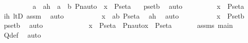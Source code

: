 \begin{isabellebody}
\ \ \ \ \ \ \isamarkupfalse%
\ \isamarkupfalse%
\ a\ \ ah\ {\isacharcolon}{\kern0pt}\ {\isachardoublequoteopen}a\ {\isacharless}{\kern0pt}\ b{\isachardoublequoteclose}\ {\isachardoublequoteopen}Pn{\isacharunderscore}{\kern0pt}auto{\isacharparenleft}{\kern0pt}{\isasympi}{\isacharparenright}{\kern0pt}\ {\isacharbackquote}{\kern0pt}\ x\ {\isasymin}\ P{\isacharunderscore}{\kern0pt}set{\isacharparenleft}{\kern0pt}a{\isacharparenright}{\kern0pt}{\isachardoublequoteclose}\ \ \isamarkupfalse%
\ psetb\ \isamarkupfalse%
\ auto\isanewline
\ \ \ \ \ \ \isamarkupfalse%
\ \isamarkupfalse%
\ {\isachardoublequoteopen}x\ {\isasymin}\ P{\isacharunderscore}{\kern0pt}set{\isacharparenleft}{\kern0pt}a{\isacharparenright}{\kern0pt}{\isachardoublequoteclose}\ \isamarkupfalse%
\ ih\ ltD\ assm\ \isamarkupfalse%
\ auto\ \isanewline
\ \ \ \ \ \ \isamarkupfalse%
\ \isamarkupfalse%
\ {\isachardoublequoteopen}x\ {\isasymin}\ {\isacharparenleft}{\kern0pt}{\isasymUnion}a{\isacharless}{\kern0pt}b{\isachardot}{\kern0pt}\ P{\isacharunderscore}{\kern0pt}set{\isacharparenleft}{\kern0pt}a{\isacharparenright}{\kern0pt}{\isacharparenright}{\kern0pt}{\isachardoublequoteclose}\ \isamarkupfalse%
\ ah\ \isamarkupfalse%
\ auto\ \isanewline
\ \ \ \ \ \ \isamarkupfalse%
\ \isamarkupfalse%
\ {\isachardoublequoteopen}x\ {\isasymin}\ P{\isacharunderscore}{\kern0pt}set{\isacharparenleft}{\kern0pt}b{\isacharparenright}{\kern0pt}{\isachardoublequoteclose}\ \isamarkupfalse%
\ psetb\ \isamarkupfalse%
\ auto\isanewline
\ \ \ \ \isamarkupfalse%
\isanewline
\ \ \isamarkupfalse%
\isanewline
\ \ \isamarkupfalse%
\ \isamarkupfalse%
\ {\isachardoublequoteopen}x\ {\isasymin}\ P{\isacharunderscore}{\kern0pt}set{\isacharparenleft}{\kern0pt}a{\isacharparenright}{\kern0pt}\ {\isasymlongleftrightarrow}\ Pn{\isacharunderscore}{\kern0pt}auto{\isacharparenleft}{\kern0pt}{\isasympi}{\isacharparenright}{\kern0pt}{\isacharbackquote}{\kern0pt}x\ {\isasymin}\ P{\isacharunderscore}{\kern0pt}set{\isacharparenleft}{\kern0pt}a{\isacharparenright}{\kern0pt}{\isachardoublequoteclose}\ \isanewline
\ \ \ \ \isamarkupfalse%
\ assms\ main\ \isamarkupfalse%
\ Q{\isacharunderscore}{\kern0pt}def\ \isamarkupfalse%
\ auto\ \isanewline
{}\isamarkupfalse%

\end{isabellebody}
